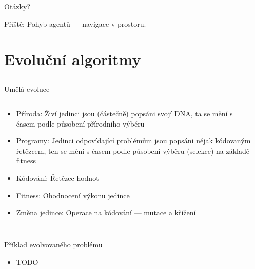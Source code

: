 \documentclass{beamer}
\begin{document}
\subsection{}
\begin{frame}{Otázky?}
\begin{center}
Příště: Pohyb agentů --- navigace v prostoru.
\end{center}
\end{frame}

\section{Evoluční algoritmy}

\subsection{}
\begin{frame}{Umělá evoluce}
\begin{columns}
\begin{column}{6cm}
\begin{itemize}
\item Příroda: Živí jedinci jsou (částečně) popsáni svojí DNA, ta se mění s časem podle působení přírodního výběru
\item Programy: Jedinci odpovídající problémům jsou popsáni nějak kódovaným řetězcem, ten se mění s časem podle působení výběru (selekce) na základě fitness
\item Kódování: Řetězec hodnot
\item Fitness: Ohodnocení výkonu jedince
\item Změna jedince: Operace na kódování --- mutace a křížení
\end{itemize}
\end{column}
\begin{column}{5cm}
\end{column}
\end{columns}
\end{frame}

\subsection{}
\begin{frame}{Příklad evolvovaného problému}
\begin{itemize}
\item TODO
\end{itemize}
\end{frame}
\end{document}
